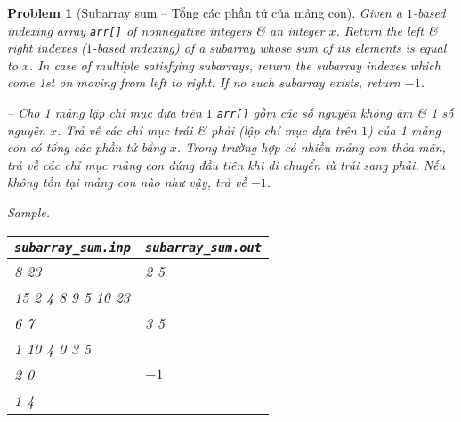 \documentclass{article}
\newtheorem{problem}{Problem}
\begin{document}
\begin{problem}[Subarray sum -- Tổng các phần tử của mảng con]
    Given a $1$-based indexing array {\tt arr[]} of nonnegative integers \& an integer $x$. Return the left \& right indexes ($1$-based indexing) of a subarray whose sum of its elements is equal to $x$. In case of multiple satisfying subarrays, return the subarray indexes which come 1st on moving from left to right. If no such subarray exists, return $-1$.

    -- Cho 1 mảng lập chỉ mục dựa trên $1$ {\tt arr[]} gồm các số nguyên không âm \& 1 số nguyên $x$. Trả về các chỉ mục trái \& phải (lập chỉ mục dựa trên $1$) của 1 mảng con có tổng các phần tử bằng $x$. Trong trường hợp có nhiều mảng con thỏa mãn, trả về các chỉ mục mảng con đứng đầu tiên khi di chuyển từ trái sang phải. Nếu không tồn tại mảng con nào như vậy, trả về $-1$.
    \item {\sf Sample.}
    \begin{table}[H]
        \centering
        \begin{tabular}{|l|l|}
            \hline
            \verb|subarray_sum.inp| & \verb|subarray_sum.out| \\
            \hline
            8 23 & 2 5\\
            15 2 4 8 9 5 10 23 & \\
            \hline
            6 7 & 3 5\\
            1 10 4 0 3 5 & \\
            \hline
            2 0 & $-1$\\
            1 4 & \\
            \hline
        \end{tabular}
    \end{table}
\end{problem}
\end{document}
